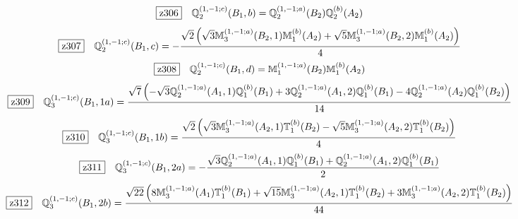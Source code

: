 \documentclass[fleqn,10pt,landscape]{jsarticle}
\begin{document}
\begin{dmath*}
\hspace*{3mm}\fbox{z306}\quad \mathbb{Q}_{2}^{(1,-1;c)}(B_{1},b)=\mathbb{Q}_{2}^{(1,-1;a)}(B_{2}) \mathbb{Q}_{2}^{(b)}(A_{2})
\end{dmath*}
\begin{dmath*}
\hspace*{3mm}\fbox{z307}\quad \mathbb{Q}_{2}^{(1,-1;c)}(B_{1},c)=- \frac{\sqrt{2} \left(\sqrt{3} \mathbb{M}_{3}^{(1,-1;a)}(B_{2},1) \mathbb{M}_{1}^{(b)}(A_{2}) + \sqrt{5} \mathbb{M}_{3}^{(1,-1;a)}(B_{2},2) \mathbb{M}_{1}^{(b)}(A_{2})\right)}{4}
\end{dmath*}
\begin{dmath*}
\hspace*{3mm}\fbox{z308}\quad \mathbb{Q}_{2}^{(1,-1;c)}(B_{1},d)=\mathbb{M}_{1}^{(1,-1;a)}(B_{2}) \mathbb{M}_{1}^{(b)}(A_{2})
\end{dmath*}
\begin{dmath*}
\hspace*{3mm}\fbox{z309}\quad \mathbb{Q}_{3}^{(1,-1;c)}(B_{1},1a)=\frac{\sqrt{7} \left(- \sqrt{3} \mathbb{Q}_{2}^{(1,-1;a)}(A_{1},1) \mathbb{Q}_{1}^{(b)}(B_{1}) + 3 \mathbb{Q}_{2}^{(1,-1;a)}(A_{1},2) \mathbb{Q}_{1}^{(b)}(B_{1}) - 4 \mathbb{Q}_{2}^{(1,-1;a)}(A_{2}) \mathbb{Q}_{1}^{(b)}(B_{2})\right)}{14}
\end{dmath*}
\begin{dmath*}
\hspace*{3mm}\fbox{z310}\quad \mathbb{Q}_{3}^{(1,-1;c)}(B_{1},1b)=\frac{\sqrt{2} \left(\sqrt{3} \mathbb{M}_{3}^{(1,-1;a)}(A_{2},1) \mathbb{T}_{1}^{(b)}(B_{2}) - \sqrt{5} \mathbb{M}_{3}^{(1,-1;a)}(A_{2},2) \mathbb{T}_{1}^{(b)}(B_{2})\right)}{4}
\end{dmath*}
\begin{dmath*}
\hspace*{3mm}\fbox{z311}\quad \mathbb{Q}_{3}^{(1,-1;c)}(B_{1},2a)=- \frac{\sqrt{3} \mathbb{Q}_{2}^{(1,-1;a)}(A_{1},1) \mathbb{Q}_{1}^{(b)}(B_{1}) + \mathbb{Q}_{2}^{(1,-1;a)}(A_{1},2) \mathbb{Q}_{1}^{(b)}(B_{1})}{2}
\end{dmath*}
\begin{dmath*}
\hspace*{3mm}\fbox{z312}\quad \mathbb{Q}_{3}^{(1,-1;c)}(B_{1},2b)=\frac{\sqrt{22} \left(8 \mathbb{M}_{3}^{(1,-1;a)}(A_{1}) \mathbb{T}_{1}^{(b)}(B_{1}) + \sqrt{15} \mathbb{M}_{3}^{(1,-1;a)}(A_{2},1) \mathbb{T}_{1}^{(b)}(B_{2}) + 3 \mathbb{M}_{3}^{(1,-1;a)}(A_{2},2) \mathbb{T}_{1}^{(b)}(B_{2})\right)}{44}
\end{dmath*}
\end{document}
